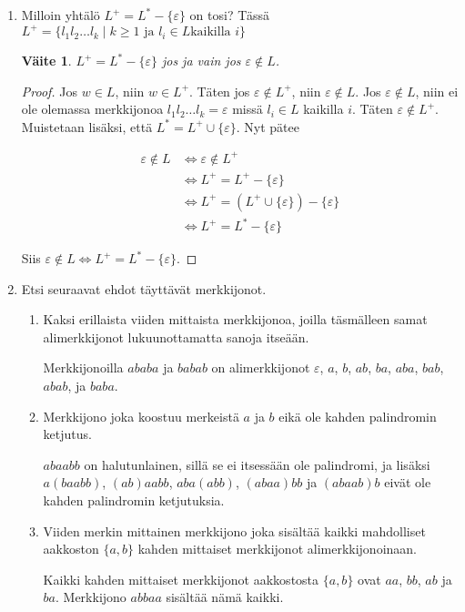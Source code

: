\documentclass[a4paper,11pt,draft]{article}
\newtheorem*{claim}{Väite}
\begin{document}
\begin{enumerate}
\newpage
\item
  Milloin yhtälö $L^+ = L^* - \{\varepsilon\}$ on tosi? Tässä $L^+ =
  \{l_1l_2 \ldots l_k \mid k \ge 1 \text{ ja } l_i \in L \text{
    kaikilla } i\}$

  \begin{claim}
    $L^+ = L^* - \{\varepsilon\}$ jos ja vain jos $\varepsilon \notin L$.
  \end{claim}

  \begin{proof}
    Jos $w \in L$, niin $w \in L^+$. Täten jos $\varepsilon \notin
    L^+$, niin $\varepsilon \notin L$. Jos $\varepsilon \notin L$,
    niin ei ole olemassa merkkijonoa $l_1l_2 \ldots l_k =
    \varepsilon$ missä $l_i \in L$ kaikilla $i$. Täten $\varepsilon
    \notin L^+$. Muistetaan lisäksi, että $L^* = L^+ \cup
    \{\varepsilon\}$. Nyt pätee

    \begin{align*}
      \varepsilon \notin L &\Leftrightarrow \varepsilon \notin L^+ \\
      &\Leftrightarrow L^+ = L^+ - \{\varepsilon\} \\
      &\Leftrightarrow L^+ = (L^+ \cup \{\varepsilon\}) -
      \{\varepsilon\} \\
      &\Leftrightarrow L^+ = L^* - \{\varepsilon\}
    \end{align*}

    Siis $\varepsilon \notin L \Leftrightarrow L^+ = L^* - \{\varepsilon\}$.
  \end{proof}

\item
  Etsi seuraavat ehdot täyttävät merkkijonot.

  \begin{enumerate}
  \item Kaksi erillaista viiden mittaista merkkijonoa, joilla
    täsmälleen samat alimerkkijonot lukuunottamatta sanoja itseään.

    Merkkijonoilla $ababa$ ja $babab$ on alimerkkijonot
    $\varepsilon$, $a$, $b$, $ab$, $ba$, $aba$, $bab$, $abab$, ja
    $baba$.
  \item Merkkijono joka koostuu merkeistä $a$ ja $b$ eikä ole kahden
    palindromin ketjutus.

    $abaabb$ on halutunlainen, sillä se ei itsessään ole palindromi,
    ja lisäksi $a(baabb)$, $(ab)aabb$, $aba(abb)$, $(abaa)bb$ ja
    $(abaab)b$ eivät ole kahden palindromin ketjutuksia.
  \item Viiden merkin mittainen merkkijono joka sisältää kaikki
    mahdolliset aakkoston $\{a,b\}$ kahden mittaiset merkkijonot
    alimerkkijonoinaan.

    Kaikki kahden mittaiset merkkijonot aakkostosta $\{a,b\}$ ovat
    $aa$, $bb$, $ab$ ja $ba$. Merkkijono $abbaa$ sisältää nämä
    kaikki.
  \end{enumerate}

\end{enumerate}
\end{document}
